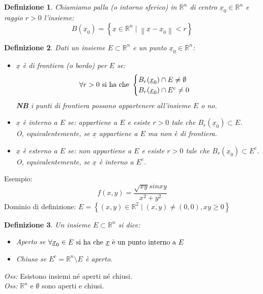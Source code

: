 \documentclass{scrreprt}
\newtheorem{defn}{Definizione}
\newenvironment{definition}{\begin{mdframed}[backgroundcolor=Ivory2]\begin{defn}}{\end{defn}\end{mdframed}}
\begin{document}

\begin{definition}
	Chiamiamo palla (o intorno sferico) in $\mathbb{R}^n$ di centro $\underline{x} _0 \in \mathbb{R}^n$ e raggio $r>0$ l'insieme:
	\begin{equation}
		B(\underline{x}_0) = \left\{\underline{x}\in\mathbb{R}^n \mid \left\|\underline{x}-\underline{x}_0\right\| < r\right\}
	\end{equation}
\end{definition}

\begin{definition}
	Dati un insieme $E\subset\mathbb{R}^n$ e un punto $\underline{x}_0\in\mathbb{R}^n$:
	\begin{itemize}
		\item $\underline{x}$ è di frontiera (o bordo) per $E$ se:
			\begin{equation}
				\forall r>0 \textnormal{ si ha che } \begin{cases}
					B_r(\underline{x}_0) \cap E \neq \emptyset \\
					B_r(\underline{x}_0) \cap E^c \neq 0
				\end{cases}
			\end{equation}
		\textbf{NB} i punti di frontiera possono appartenere all'insieme $E$ o no.
		\item $\underline{x}$ è interno a $E$ se: appartiene a $E$ e esiste $r>0$ tale che $B_r(\underline{x}_0) \subset E$.\\
		O, equivalentemente, se $\underline{x}$ appartiene a $E$ ma non è di frontiera.
		\item $\underline{x}$ è esterno a $E$ se: non appartiene a $E$ e esiste $r>0$ tale che $B_r(\underline{x}_0) \subset E^c$.\\
		O, equivalentemente, se $\underline{x}$ è interno a $E^c$.
	\end{itemize}
\end{definition}
Esempio:
\begin{equation}
	f(x,y) = \frac{\sqrt{xy}sin{xy} }{x^2+y^2}
\end{equation}
Dominio di definizione: $E = \left\{ (x,y) \in \mathbb{R}^2 \mid (x,y) \neq (0,0), xy \geq 0 \right\}$\\



\begin{definition}
	Un insieme $E\subset\mathbb{R}^n$ si dice:
	\begin{itemize}
		\item Aperto se $\forall \underline{x}_0 \in E \textnormal{ si ha che } \underline{x} \textnormal{ è un punto interno a } E$
		\item Chiuso se $E^c=\mathbb{R}^n\setminus E$ è aperto.
	\end{itemize}
\end{definition}
\emph{Oss:} Esistono insiemi né aperti né chiusi.\\
\emph{Oss:} $\mathbb{R}^n$ e $\emptyset$ sono aperti e chiusi.\\
\end{document}
